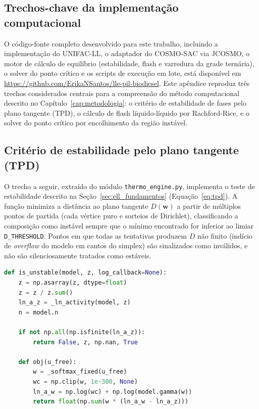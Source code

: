 \begin{apendicesenv}

\chapter{Trechos-chave da implementação computacional}
\label{apendice:codigo}

O código-fonte completo desenvolvido para este trabalho, incluindo a implementação do UNIFAC-LL, o adaptador do COSMO-SAC via JCOSMO, o motor de cálculo de equilíbrio (estabilidade, flash e varredura da grade ternária), o solver do ponto crítico e os scripts de execução em lote, está disponível em \url{https://github.com/ErikaNSantos/lle-pil-biodiesel}. Este apêndice reproduz três trechos considerados centrais para a compreensão do método computacional descrito no Capítulo~\ref{cap:metodologia}: o critério de estabilidade de fases pelo plano tangente (TPD), o cálculo de flash líquido-líquido por Rachford-Rice, e o solver do ponto crítico por encolhimento da região instável.

\section{Critério de estabilidade pelo plano tangente (TPD)}
\label{apendice:tpd}

O trecho a seguir, extraído do módulo \texttt{thermo\_engine.py}, implementa o teste de estabilidade descrito na Seção~\ref{sec:ell_fundamentos} (Equação~\ref{eq:tpd}). A função minimiza a distância ao plano tangente $D(\mathbf{w})$ a partir de múltiplos pontos de partida (cada vértice puro e sorteios de Dirichlet), classificando a composição como instável sempre que o mínimo encontrado for inferior ao limiar \texttt{D\_THRESHOLD}. Pontos em que todas as tentativas produzem $D$ não finito (indício de \textit{overflow} do modelo em cantos do simplex) são sinalizados como inválidos, e não são silenciosamente tratados como estáveis.

\begin{lstlisting}[language=Python, basicstyle=\small\ttfamily, breaklines=true, caption={Teste de estabilidade pelo critério do plano tangente (thermo\_engine.py).}]
def is_unstable(model, z, log_callback=None):
    z = np.asarray(z, dtype=float)
    z = z / z.sum()
    ln_a_z = _ln_activity(model, z)
    n = model.n

    if not np.all(np.isfinite(ln_a_z)):
        return False, z, np.nan, True

    def obj(u_free):
        w = _softmax_fixed(u_free)
        wc = np.clip(w, 1e-300, None)
        ln_a_w = np.log(wc) + np.log(model.gamma(w))
        return float(np.sum(w * (ln_a_w - ln_a_z)))


\end{lstlisting}
\end{apendicesenv}
